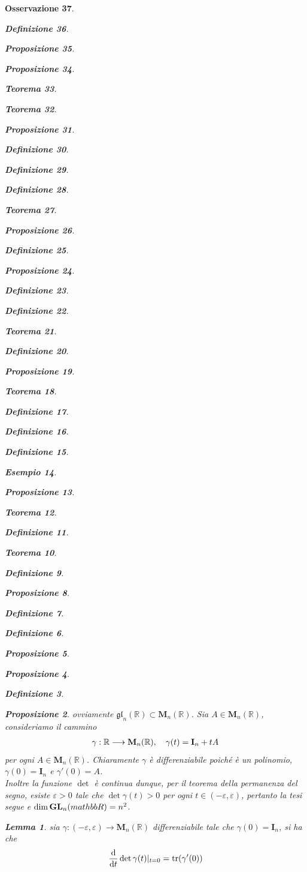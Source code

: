 \documentclass[oneside, 11pt]{amsbook}
\makeatletter
\newcommand{\0}{{(0)}}
\newcommand{\3}{{(3)}}
\theoremstyle{colonplain}
\newtheorem{thm}{Teorema}[chapter]
\newtheorem{prop}[thm]{Proposizione}
\newtheorem{lemma}[thm]{Lemma}
\theoremstyle{colondefinition}
\newtheorem{defn}[thm]{Definizione}
\newtheorem{ex}[thm]{Esempio}
\theoremstyle{colonremark}
\newtheorem{rmk}[thm]{Osservazione}
\numberwithin{equation}{chapter}
\renewcommand{\proofname}{Dimostrazione}
\renewenvironment{proof}[1][\proofname]{\par
  \pushQED{\end{proof}}%
  \normalfont \topsep6\p@\@plus6\p@\relax
  \trivlist
  \item[\hskip\labelsep\bfseries #1:]\ignorespaces
}{%
  \popQED\endtrivlist\@endpefalse
}
\makeatother
\begin{document}
\begin{rmk}
\begin{defn}
\begin{prop}
\begin{prop}
\begin{thm}
\begin{thm}
\begin{prop}
\begin{defn}
\begin{defn}
\begin{defn}
\begin{thm}
\begin{prop}
\begin{defn}
\begin{prop}
\begin{defn}
\begin{defn}
\begin{thm}
\begin{defn}
\begin{prop}
\begin{thm}
\begin{defn}
\begin{defn}
\begin{defn}
\begin{ex}
\begin{prop}
\begin{thm}
\begin{defn}
\begin{thm}
\begin{defn}
\begin{prop}
\begin{proof}
\begin{proof}
\begin{proof}
\begin{proof}
\begin{proof}[Soluzione]
\begin{proof}
\begin{proof}
\begin{proof}
\begin{defn}
\begin{defn}
\begin{prop}
\begin{prop}
\begin{defn}
\begin{prop}
\begin{proof} ovviamente $\mathfrak{gl}_n(\mathbb{R}) \subset \mathbf{M}_n(\mathbb{R})$. Sia $A \in \mathbf{M}_n(\mathbb{R})$, consideriamo il cammino
\begin{align}
    \gamma : \mathbb{R} \longrightarrow \mathbf{M}_n(\mathbb{R}), \quad \gamma(t) = \mathbf{I}_n + tA \notag
\end{align}
per ogni $A \in \mathbf{M}_n(\mathbb{R})$. Chiaramente $\gamma$ è differenziabile poiché è un polinomio,  $\gamma(0) = \mathbf{I}_n$ e $\gamma'(0) = A$. \\
Inoltre la funzione $\det$ è continua dunque, per il teorema della permanenza del segno, esiste $\varepsilon > 0$ tale che $\det \gamma(t) > 0$ per ogni $t \in (-\varepsilon, \varepsilon)$, pertanto la tesi segue e $\dim \mathbf{GL}_n(\\mathbb{R}) = n^2$. \end{proof}
\begin{lemma} sia $\gamma : (-\varepsilon, \varepsilon) \longrightarrow \mathbf{M}_n(\mathbb{R})$ differenziabile tale che $\gamma(0) = \mathbf{I}_n$, si ha che
\begin{align}
    \frac{\mathrm{d}}{\mathrm{d}t} \det \gamma(t) |_{t = 0} = \mathrm{tr}(\gamma'(0)) \notag
\end{align} \\


\end{lemma}
\end{prop}
\end{defn}
\end{prop}
\end{prop}
\end{defn}
\end{defn}
\end{proof}
\end{proof}
\end{proof}
\end{proof}
\end{proof}
\end{proof}
\end{proof}
\end{proof}
\end{prop}
\end{defn}
\end{thm}
\end{defn}
\end{thm}
\end{prop}
\end{ex}
\end{defn}
\end{defn}
\end{defn}
\end{thm}
\end{prop}
\end{defn}
\end{thm}
\end{defn}
\end{defn}
\end{prop}
\end{defn}
\end{prop}
\end{thm}
\end{defn}
\end{defn}
\end{defn}
\end{prop}
\end{thm}
\end{thm}
\end{prop}
\end{prop}
\end{defn}
\end{rmk}
\end{document}
